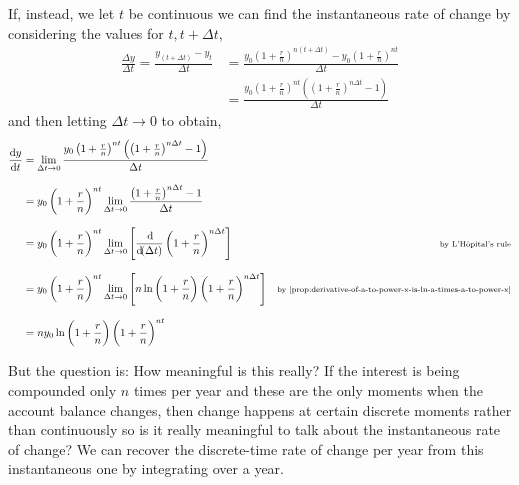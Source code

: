\documentclass[../MathsNotesBase.tex]{subfiles}
\begin{document}
{\begin{exe}
{				If, instead, we let $t$ be continuous we can find the instantaneous rate of change by considering the values for ${ t, t + \Delta t }$,
				\begin{align*}
				\frac{\Delta y}{\Delta t} = \frac{y_{(t + \Delta t)} - y_t}{\Delta t} &=  \frac{y_0 \left(1 + \frac{r}{n}\right)^{n(t + \Delta t)} - y_0 \left(1 + \frac{r}{n}\right)^{nt}}{\Delta t} \\[8pt]
				&= \frac{y_0\left(1 + \frac{r}{n}\right)^{nt}\left(\left(1 + \frac{r}{n}\right)^{n\Delta t} - 1\right)}{\Delta t}
				\end{align*}
				and then letting ${ \Delta t \to 0 }$ to obtain,
				\begin{align*}
				\frac{\dif y}{\dif t} &= \lim_{\Delta t \to 0} \frac{y_0\left(1 + \frac{r}{n}\right)^{nt}\left(\left(1 + \frac{r}{n}\right)^{n\Delta t} - 1\right)}{\Delta t} \\[8pt]
				&= y_0\left(1 + \frac{r}{n}\right)^{nt} \lim_{\Delta t \to 0} \frac{\left(1 + \frac{r}{n}\right)^{n\Delta t} - 1}{\Delta t} &\sidecomment{} \\[8pt]
				&= y_0\left(1 + \frac{r}{n}\right)^{nt} \lim_{\Delta t \to 0} \left[\frac{\dif}{\dif (\Delta t)} \left(1 + \frac{r}{n}\right)^{n\Delta t}\right] &\sidecomment{by L'H\^{o}pital's rule} \\[8pt]
				&= y_0\left(1 + \frac{r}{n}\right)^{nt} \lim_{\Delta t \to 0} \left[n\ln{\left(1 + \frac{r}{n}\right)}\left(1 + \frac{r}{n}\right)^{n\Delta t}\right] &\sidecomment{by \autoref{prop:derivative-of-a-to-power-x-is-ln-a-times-a-to-power-x}} \\[8pt]
				&= ny_0 \ln{\left(1 + \frac{r}{n}\right)} \left(1 + \frac{r}{n}\right)^{nt}
				\end{align*}

				But the question is: How meaningful is this really? If the interest is being compounded only $n$ times per year and these are the only moments when the account balance changes, then change happens at certain discrete moments rather than continuously so is it really meaningful to talk about the instantaneous rate of change? We can recover the discrete-time rate of change per year from this instantaneous one by integrating over a year.\\
				
}
\end{exe}}
\end{document}
